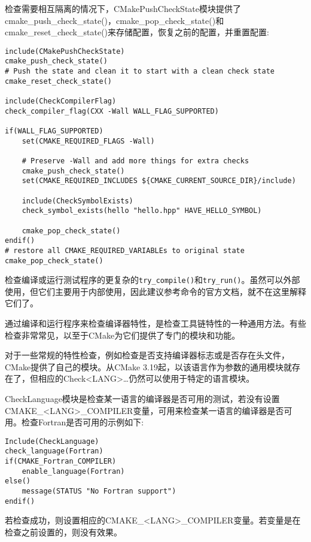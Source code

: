 检查需要相互隔离的情况下，CMakePushCheckState模块提供了cmake\_push\_check\_state()，cmake\_pop\_check\_state()和cmake\_reset\_check\_state()来存储配置，恢复之前的配置，并重置配置:

\begin{lstlisting}[style=styleCMake]
include(CMakePushCheckState)
cmake_push_check_state()
# Push the state and clean it to start with a clean check state
cmake_reset_check_state()

include(CheckCompilerFlag)
check_compiler_flag(CXX -Wall WALL_FLAG_SUPPORTED)

if(WALL_FLAG_SUPPORTED)
	set(CMAKE_REQUIRED_FLAGS -Wall)
	
	# Preserve -Wall and add more things for extra checks
	cmake_push_check_state()
	set(CMAKE_REQUIRED_INCLUDES ${CMAKE_CURRENT_SOURCE_DIR}/include)

	include(CheckSymbolExists)
	check_symbol_exists(hello "hello.hpp" HAVE_HELLO_SYMBOL)
	
	cmake_pop_check_state()
endif()
# restore all CMAKE_REQUIRED_VARIABLEs to original state
cmake_pop_check_state()
\end{lstlisting}

检查编译或运行测试程序的更复杂的\texttt{try\_compile()}和\texttt{try\_run()}。虽然可以外部使用，但它们主要用于内部使用，因此建议参考命令的官方文档，就不在这里解释它们了。

通过编译和运行程序来检查编译器特性，是检查工具链特性的一种通用方法。有些检查非常常见，以至于CMake为它们提供了专门的模块和功能。


对于一些常规的特性检查，例如检查是否支持编译器标志或是否存在头文件，CMake提供了自己的模块。从CMake 3.19起，以该语言作为参数的通用模块就存在了，但相应的Check<LANG>…仍然可以使用于特定的语言模块。

CheckLanguage模块是检查某一语言的编译器是否可用的测试，若没有设置CMAKE\_<LANG>\_COMPILER变量，可用来检查某一语言的编译器是否可用。检查Fortran是否可用的示例如下:

\begin{lstlisting}[style=styleCMake]
Include(CheckLanguage)
check_language(Fortran)
if(CMAKE_Fortran_COMPILER)
	enable_language(Fortran)
else()
	message(STATUS "No Fortran support")
endif()
\end{lstlisting}

若检查成功，则设置相应的CMAKE\_<LANG>\_COMPILER变量。若变量是在检查之前设置的，则没有效果。

